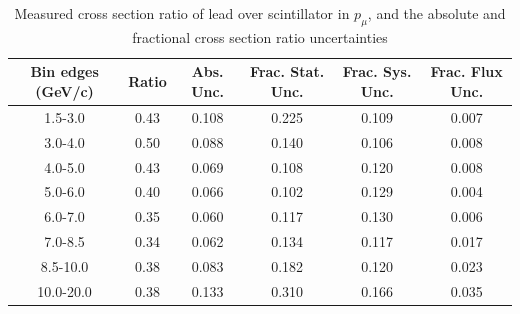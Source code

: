 \documentclass[../main.tex]{subfiles}
\begin{document}
\begin{table}
  \centering
  \renewcommand{\arraystretch}{1.15}
  \caption{Measured cross section ratio of lead over scintillator in $p_{\mu}$, and the absolute and fractional cross section ratio uncertainties}
    \begin{tabular}{c||c|c||c|c|c}
      Bin edges (GeV/c) &  Ratio  &  Abs. Unc.  &  Frac. Stat. Unc.  &  Frac. Sys. Unc.  &  Frac. Flux Unc. \\
      \hline
      \hline
      1.5-3.0 & 0.43 & 0.108 & 0.225 & 0.109 & 0.007\\
      3.0-4.0 & 0.50 & 0.088 & 0.140 & 0.106 & 0.008\\
      4.0-5.0 & 0.43 & 0.069 & 0.108 & 0.120 & 0.008\\
      5.0-6.0 & 0.40 & 0.066 & 0.102 & 0.129 & 0.004\\
      6.0-7.0 & 0.35 & 0.060 & 0.117 & 0.130 & 0.006\\
      7.0-8.5 & 0.34 & 0.062 & 0.134 & 0.117 & 0.017\\
      8.5-10.0 & 0.38 & 0.083 & 0.182 & 0.120 & 0.023\\
      10.0-20.0 & 0.38 & 0.133 & 0.310 & 0.166 & 0.035
    \end{tabular}
  \label{tbl:rationucleonnuc82muon_pa}
\end{table}
\begin{table}
  \centering
  \renewcommand{\arraystretch}{1.15}
  \caption{Statistical covariance matrix of measured cross section ratio of lead over scintillator in $p_{\mu}$}
  \label{tbl:rationucleonnuc82muon_pb}
\end{table}
\end{document}
